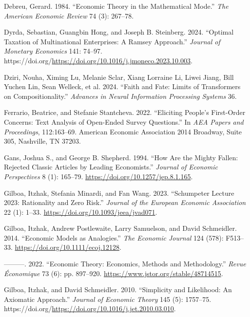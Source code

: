 \documentclass[
]{article}
\newlength{\cslhangindent}
\newenvironment{CSLReferences}[2] %
 {\begin{list}{}{%
  \setlength{\itemindent}{0pt}
  \setlength{\leftmargin}{0pt}
  \setlength{\parsep}{0pt}
  \ifodd #1
   \setlength{\leftmargin}{\cslhangindent}
   \setlength{\itemindent}{-1\cslhangindent}
  \fi
  \setlength{\itemsep}{#2\baselineskip}}}
 {\end{list}}
\theoremstyle{plain}
\theoremstyle{definition}
\theoremstyle{remark}
\begin{document}
\begin{CSLReferences}{1}{0}
Debreu, Gerard. 1984. {``Economic Theory in the Mathematical Mode.''}
\emph{The American Economic Review} 74 (3): 267--78.

Dyrda, Sebastian, Guangbin Hong, and Joseph B. Steinberg. 2024.
{``Optimal Taxation of Multinational Enterprises: A Ramsey Approach.''}
\emph{Journal of Monetary Economics} 141: 74--97.
https://doi.org/\url{https://doi.org/10.1016/j.jmoneco.2023.10.003}.

Dziri, Nouha, Ximing Lu, Melanie Sclar, Xiang Lorraine Li, Liwei Jiang,
Bill Yuchen Lin, Sean Welleck, et al. 2024. {``Faith and Fate: Limits of
Transformers on Compositionality.''} \emph{Advances in Neural
Information Processing Systems} 36.

Ferrario, Beatrice, and Stefanie Stantcheva. 2022. {``Eliciting People's
First-Order Concerns: Text Analysis of Open-Ended Survey Questions.''}
In \emph{AEA Papers and Proceedings}, 112:163--69. American Economic
Association 2014 Broadway, Suite 305, Nashville, TN 37203.

Gans, Joshua S., and George B. Shepherd. 1994. {``How Are the Mighty
Fallen: Rejected Classic Articles by Leading Economists.''}
\emph{Journal of Economic Perspectives} 8 (1): 165--79.
\url{https://doi.org/10.1257/jep.8.1.165}.

Gilboa, Itzhak, Stefania Minardi, and Fan Wang. 2023. {``{Schumpeter
Lecture 2023: Rationality and Zero Risk}.''} \emph{Journal of the
European Economic Association} 22 (1): 1--33.
\url{https://doi.org/10.1093/jeea/jvad071}.

Gilboa, Itzhak, Andrew Postlewaite, Larry Samuelson, and David
Schmeidler. 2014. {``{Economic Models as Analogies}.''} \emph{The
Economic Journal} 124 (578): F513--33.
\url{https://doi.org/10.1111/ecoj.12128}.

---------. 2022. {``Economic Theory: Economics, Methods and
Methodology.''} \emph{Revue Économique} 73 (6): pp. 897--920.
\url{https://www.jstor.org/stable/48714515}.

Gilboa, Itzhak, and David Schmeidler. 2010. {``Simplicity and
Likelihood: An Axiomatic Approach.''} \emph{Journal of Economic Theory}
145 (5): 1757--75.
https://doi.org/\url{https://doi.org/10.1016/j.jet.2010.03.010}.


\end{CSLReferences}
\end{document}
